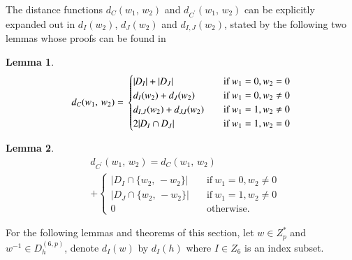 \documentclass[letter]{ieice}
\newtheorem{sec3_lemma1}{Lemma} \newtheorem{sec3_lemma2}[sec3_lemma1]{Lemma}
\begin{document}
 The distance functions $  d_{\mathit{C}}(w_{1},\,w_{2}) $ and $ d_{\mathit{C}^{'}}(w_{1},\,w_{2}) $ can be explicitly expanded out in $ d_{I}(w_{2})  $, $ d_{J}(w_{2})  $ and $ d_{I,J}(w_{2}) $, stated by the following two lemmas whose proofs can be found in \cite[eq.(2) and eq.(4)]{ar03}
  \begin{sec3_lemma1}\label{lab-sec3-lamma1}
   \begin{equation*}
   d_{\mathit{C}}(w_{1},\,w_{2})=\\
   \begin{cases}
   |\mathit{D}_{I}|+|\mathit{D}_{J}|&\quad\mbox{if}\ w_{1}=0,w_{2}=0\\
   d_{I}(w_{2})+d_{J}(w_{2})&\quad\mbox{if}\ w_{1}=0,w_{2}\ne 0\\
   d_{I,J}(w_{2})+d_{J,I}(w_{2})&\quad\mbox{if}\ w_{1}=1,w_{2}\ne 0\\
   2|\mathit{D}_{I}\cap \mathit{D}_{J}|&\quad\mbox{if}\ w_{1}=1,w_{2}= 0
   \end{cases}
   \end{equation*}
   \end{sec3_lemma1}
 \begin{sec3_lemma2}\label{lab-sec3-lamma2}
  \begin{equation*}
  \begin{split}
   &d_{\mathit{C}^{'}}(w_{1},\,w_{2})=d_{\mathit{C}}(w_{1},\,w_{2})\\
   &+
    \begin{cases}
      |\mathit{D}_{I}\cap \lbrace w_{2},\,-w_{2}\rbrace|&\quad\mbox{if}\ w_{1}=0,w_{2}\ne 0\\
      |\mathit{D}_{J}\cap \lbrace w_{2},\,-w_{2}\rbrace|&\quad\mbox{if}\ w_{1}=1,w_{2}\ne 0\\
     0 &\quad\mbox{otherwise}.
    \end{cases}
  \end{split}
  \end{equation*}
  \end{sec3_lemma2}
  
  For the following lemmas and theorems of this section,  let $ w\in Z_{p}^{*} $ and $ w^{-1} \in  D_{h}^{(6,p)}$, denote $ d_{I}(w) $ by  $ d_{I}(h) $ where $ I\in Z_{6}$ is an index subset.
\end{document}
